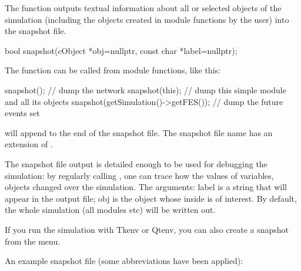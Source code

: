 The  function outputs textual information about all
or selected objects of the simulation (including the objects created
in module functions by the user) into the snapshot file.

\begin{cpp}
bool snapshot(cObject *obj=nullptr, const char *label=nullptr);
\end{cpp}

The function can be called from module functions, like this:

\begin{cpp}
snapshot();     // dump the network
snapshot(this); // dump this simple module and all its objects
snapshot(getSimulation()->getFES()); // dump the future events set
\end{cpp}

 will append to the end of the snapshot file. The snapshot
file name has an extension of .

The snapshot file output is detailed enough to be used for debugging
the simulation: by regularly calling , one can trace
how the values of variables, objects changed over the simulation.
The arguments: label is a string that will appear in the output
file; obj is the object whose inside is of interest. By default,
the whole simulation (all modules etc) will be written out.

If you run the simulation with Tkenv or Qtenv, you can also create a
snapshot from the menu.

An example snapshot file (some abbreviations have been applied):

